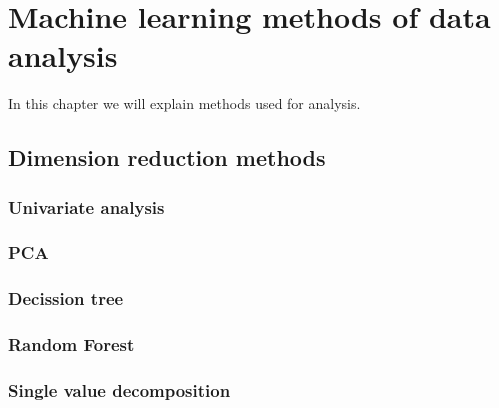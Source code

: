 \chapter{Machine learning methods of data analysis}
In this chapter we will explain methods used for analysis.

\section{Dimension reduction methods}
\subsection{Univariate analysis}
\subsection{PCA}
\subsection{Decission tree}
\subsection{Random Forest}
\subsection{Single value decomposition}

